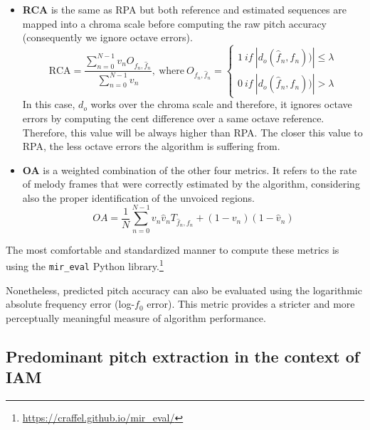 \begin{itemize}
    \item \textbf{RCA} is the same as RPA but both reference and estimated sequences are mapped into a chroma scale before computing the raw pitch accuracy (consequently we ignore octave errors).
    \begin{equation}
        \text{RCA} = \frac{\sum_{n=0}^{N-1}v_nO_{f_n, \hat{f}_n}} {\sum_{n=0}^{N-1}v_n},\ \text{where}\ O_{f_n, \hat{f}_n} = \left\{\begin{matrix}
        1\ if \ \left | d_o(\hat{f}_n, f_n)) \right | \leq \lambda \\ 
        0\ if \ \left | d_o(\hat{f}_n, f_n)) \right | >  \lambda
        \end{matrix}\right.
    \end{equation}
    In this case, $d_o$ works over the chroma scale and therefore, it ignores octave errors by computing the cent difference over a same octave reference. Therefore, this value will be always higher than RPA. The closer this value to RPA, the less octave errors the algorithm is suffering from. 
    
    \item \textbf{OA} is a weighted combination of the other four metrics. It refers to the rate of melody frames that were correctly estimated by the algorithm, considering also the proper identification of the unvoiced regions.
    \begin{equation}
        OA = \frac{1}{N}\sum_{n=0}^{N-1}v_n\hat{v}_nT_{\hat{f}_n, f_n} + (1-v_n)(1-\hat{v}_n)
    \end{equation}
    
\end{itemize}

The most comfortable and standardized manner to compute these metrics is using the \texttt{mir\_eval} Python library.\footnote{\url{https://craffel.github.io/mir\_eval/}}

Nonetheless, predicted pitch accuracy can also be evaluated using the logarithmic absolute frequency error (log-$f_0$ error). This metric provides a stricter and more perceptually meaningful measure of algorithm performance.


\subsection{Predominant pitch extraction in the context of IAM}\label{sec:ch02_pitch_iam}


